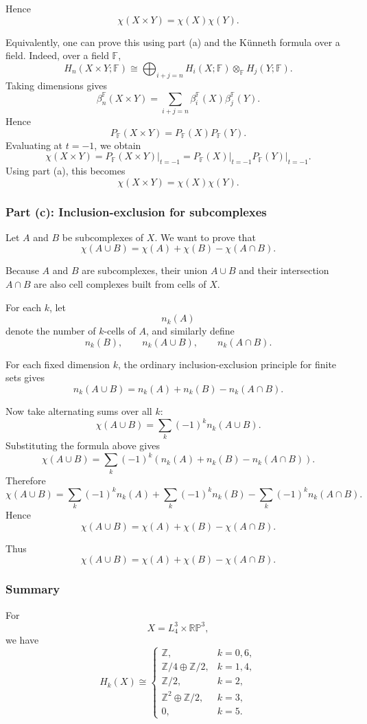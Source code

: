 \documentclass[12pt,a4paper]{article}
\theoremstyle{notespace}
\begin{document}
Hence
\[
\boxed{\chi(X\times Y)=\chi(X)\chi(Y).}
\]

Equivalently, one can prove this using part (a) and the Künneth formula over a field. Indeed, over a field \(\mathbb F\),
\[
H_n(X\times Y;\mathbb F)
\cong
\bigoplus_{i+j=n}
H_i(X;\mathbb F)\otimes_{\mathbb F}H_j(Y;\mathbb F).
\]
Taking dimensions gives
\[
\beta_n^{\mathbb F}(X\times Y)
=
\sum_{i+j=n}
\beta_i^{\mathbb F}(X)\beta_j^{\mathbb F}(Y).
\]
Hence
\[
P_{\mathbb F}(X\times Y)
=
P_{\mathbb F}(X)P_{\mathbb F}(Y).
\]
Evaluating at \(t=-1\), we obtain
\[
\chi(X\times Y)
=
P_{\mathbb F}(X\times Y)\big|_{t=-1}
=
P_{\mathbb F}(X)\big|_{t=-1}
P_{\mathbb F}(Y)\big|_{t=-1}.
\]
Using part (a), this becomes
\[
\chi(X\times Y)=\chi(X)\chi(Y).
\]

\subsubsection{Part (c): Inclusion-exclusion for subcomplexes}

Let \(A\) and \(B\) be subcomplexes of \(X\). We want to prove that
\[
\chi(A\cup B)=\chi(A)+\chi(B)-\chi(A\cap B).
\]

Because \(A\) and \(B\) are subcomplexes, their union \(A\cup B\) and their intersection \(A\cap B\) are also cell complexes built from cells of \(X\).

For each \(k\), let
\[
n_k(A)
\]
denote the number of \(k\)-cells of \(A\), and similarly define
\[
n_k(B),
\qquad
n_k(A\cup B),
\qquad
n_k(A\cap B).
\]

For each fixed dimension \(k\), the ordinary inclusion-exclusion principle for finite sets gives
\[
n_k(A\cup B)
=
n_k(A)+n_k(B)-n_k(A\cap B).
\]

Now take alternating sums over all \(k\):
\[
\chi(A\cup B)
=
\sum_k (-1)^k n_k(A\cup B).
\]
Substituting the formula above gives
\[
\chi(A\cup B)
=
\sum_k (-1)^k
\left(
n_k(A)+n_k(B)-n_k(A\cap B)
\right).
\]
Therefore
\[
\chi(A\cup B)
=
\sum_k (-1)^k n_k(A)
+
\sum_k (-1)^k n_k(B)
-
\sum_k (-1)^k n_k(A\cap B).
\]
Hence
\[
\chi(A\cup B)
=
\chi(A)+\chi(B)-\chi(A\cap B).
\]

Thus
\[
\boxed{
	\chi(A\cup B)=\chi(A)+\chi(B)-\chi(A\cap B).}
\]

\subsubsection{Summary}

For
\[
X=L_4^3\times \mathbb{RP}^3,
\]
we have
\[
\boxed{
	H_k(X)\cong
	\begin{cases}
		\mathbb Z, & k=0,6,\\[1mm]
		\mathbb Z/4\oplus \mathbb Z/2, & k=1,4,\\[1mm]
		\mathbb Z/2, & k=2,\\[1mm]
		\mathbb Z^2\oplus \mathbb Z/2, & k=3,\\[1mm]
		0, & k=5.
\end{cases}}
\]
\end{document}

